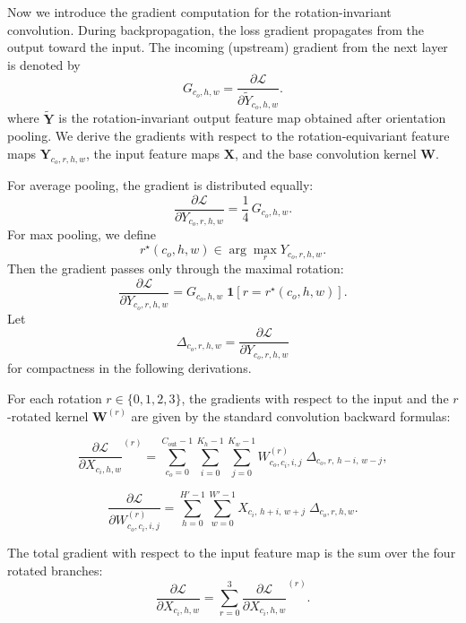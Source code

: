 Now we introduce the gradient computation for the rotation-invariant convolution.
During backpropagation, the loss gradient propagates from the output toward the input.
The incoming (upstream) gradient from the next layer is denoted by
\[
G_{c_o,h,w}
=
\frac{\partial\mathcal{L}}{\partial \widetilde{Y}_{c_o,h,w}}.
\]
where \(\widetilde{\mathbf{Y}}\) is the rotation-invariant output feature map obtained after
orientation pooling. 
We derive the gradients with respect to the
rotation-equivariant feature maps \(\mathbf{Y}_{c_o,r,h,w}\),
the input feature maps \(\mathbf{X}\),
and the base convolution kernel \(\mathbf{W}\).


For average pooling, the gradient is distributed equally:
\begin{equation}
\label{eq:rot-back-avg}
\frac{\partial\mathcal{L}}{\partial Y_{c_o,r,h,w}}
=
\frac{1}{4}\,G_{c_o,h,w}.
\end{equation}
For max pooling, we define
\[
r^\star(c_o,h,w)
\in
\arg\max_{r} Y_{c_o,r,h,w}.
\]
Then the gradient passes only through the maximal rotation:
\begin{equation}
\label{eq:rot-back-max}
\frac{\partial\mathcal{L}}{\partial Y_{c_o,r,h,w}}
=
G_{c_o,h,w}\;
\mathbf{1}\!\left[r = r^\star(c_o,h,w)\right].
\end{equation}
Let
\[
\Delta_{c_o,r,h,w}
=
\frac{\partial\mathcal{L}}{\partial Y_{c_o,r,h,w}}
\]
for compactness in the following derivations.


For each rotation \(r \in \{0,1,2,3\}\), the gradients with respect to the
input and the \(r\)-rotated kernel \(\mathbf{W}^{(r)}\)
are given by the standard convolution backward formulas:

\begin{equation}
\label{eq:rot-back-X-explicit}
\frac{\partial\mathcal{L}}{\partial X_{c_i,h,w}}^{(r)}
=
\sum_{c_o=0}^{C_{\mathrm{out}}-1}
\sum_{i=0}^{K_h-1}
\sum_{j=0}^{K_w-1}
W^{(r)}_{c_o,c_i,i,j}\;
\Delta_{c_o,r,\,h-i,\,w-j},
\end{equation}

\begin{equation}
\label{eq:rot-back-W-explicit}
\frac{\partial\mathcal{L}}{\partial W^{(r)}_{c_o,c_i,i,j}}
=
\sum_{h=0}^{H'-1}
\sum_{w=0}^{W'-1}
X_{c_i,\,h+i,\,w+j}\;
\Delta_{c_o,r,h,w}.
\end{equation}


The total gradient with respect to the input feature map is the sum over
the four rotated branches:
\begin{equation}
\label{eq:rot-back-X-total}
\frac{\partial\mathcal{L}}{\partial X_{c_i,h,w}}
=
\sum_{r=0}^{3}
\frac{\partial\mathcal{L}}{\partial X_{c_i,h,w}}^{(r)}.
\end{equation}

